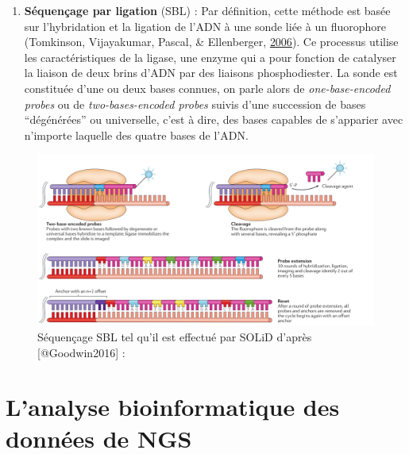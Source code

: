 \documentclass[12pt,twoside]{reedthesis}
\providecommand{\tightlist}{%
  \setlength{\itemsep}{0pt}\setlength{\parskip}{0pt}}
\theoremstyle{definition}
\theoremstyle{definition}
\theoremstyle{remark}
\begin{document}
  \newpage
  
  \begin{enumerate}
  \def\labelenumi{\arabic{enumi}.}
  \setcounter{enumi}{1}
  \tightlist
  \item
    \textbf{Séquençage par ligation} (SBL) : Par définition, cette méthode
    est basée sur l'hybridation et la ligation de l'ADN à une sonde liée à
    un fluorophore (Tomkinson, Vijayakumar, Pascal, \& Ellenberger,
    \protect\hyperlink{ref-Tomkinson2006}{2006}). Ce processus utilise les
    caractéristiques de la ligase, une enzyme qui a pour fonction de
    catalyser la liaison de deux brins d'ADN par des liaisons
    phosphodiester. La sonde est constituée d'une ou deux bases connues,
    on parle alors de \emph{one-base-encoded probes} ou de
    \emph{two-bases-encoded probes} suivis d'une succession de bases
    ``dégénérées'' ou universelle, c'est à dire, des bases capables de
    s'apparier avec n'importe laquelle des quatre bases de l'ADN.
  \end{enumerate}
  
  \begin{figure}
  
  {\centering \includegraphics[scale=.26]{figure/SBL_seq_solid} 
  
  }
  
  \caption[Séquençage SBL tel qu'il est effectué par SOLiD]{Séquençage SBL tel qu'il est effectué par SOLiD d'après [@Goodwin2016] : }\label{fig:sblSeq}
  \end{figure}
  
  \newpage  
  
  \section{L'analyse bioinformatique des données de
  NGS}\label{lanalyse-bioinformatique-des-donnees-de-ngs}
  
\end{document}
